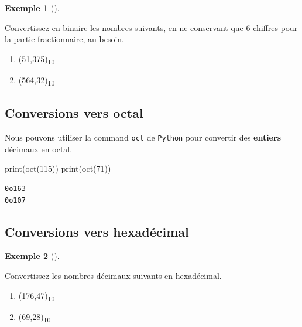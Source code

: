 \documentclass[
  letterpaper,
]{scrbook}
\newenvironment{Shaded}{\begin{snugshade}}{\end{snugshade}}
\newcommand{\BuiltInTok}[1]{\textcolor[rgb]{0.00,0.50,0.00}{#1}}
\newcommand{\DecValTok}[1]{\textcolor[rgb]{0.25,0.63,0.44}{#1}}
\newcommand{\NormalTok}[1]{\textcolor[rgb]{0.00,0.44,0.13}{#1}}
\providecommand{\tightlist}{%
  \setlength{\itemsep}{0pt}\setlength{\parskip}{0pt}}\usepackage{longtable,booktabs,array}
\theoremstyle{plain}
\theoremstyle{definition}
\theoremstyle{definition}
\newtheorem{example}{Exemple}[chapter]
\theoremstyle{remark}
\begin{document}
\begin{example}[]\protect\hypertarget{exm-conversion-binaire-totale}{}\label{exm-conversion-binaire-totale}

Convertissez en binaire les nombres suivants, en ne conservant que 6
chiffres pour la partie fractionnaire, au besoin.

\begin{enumerate}
\def\labelenumi{\alph{enumi})}
\tightlist
\item
  (51,375)\textsubscript{10}
\item
  (564,32)\textsubscript{10}
\end{enumerate}

\end{example}

\hypertarget{conversions-vers-octal}{%
\subsection{Conversions vers octal}\label{conversions-vers-octal}}

Nous pouvons utiliser la command \texttt{oct} de \texttt{Python} pour
convertir des \textbf{entiers} décimaux en octal.

\hypertarget{conversion-octal}{}
\begin{Shaded}
\begin{Highlighting}[]
\BuiltInTok{print}\NormalTok{(}\BuiltInTok{oct}\NormalTok{(}\DecValTok{115}\NormalTok{))}
\BuiltInTok{print}\NormalTok{(}\BuiltInTok{oct}\NormalTok{(}\DecValTok{71}\NormalTok{))}
\end{Highlighting}
\end{Shaded}

\begin{verbatim}
0o163
0o107
\end{verbatim}

\hypertarget{conversions-vers-hexaduxe9cimal}{%
\subsection{Conversions vers
hexadécimal}\label{conversions-vers-hexaduxe9cimal}}

\begin{example}[]\protect\hypertarget{exm-conversion-decimal-hexadecimal}{}\label{exm-conversion-decimal-hexadecimal}

Convertissez les nombres décimaux suivants en hexadécimal.

\begin{enumerate}
\def\labelenumi{\alph{enumi})}
\tightlist
\item
  (176,47)\textsubscript{10}
\item
  (69,28)\textsubscript{10}
\end{enumerate}

\end{example}
\end{document}
